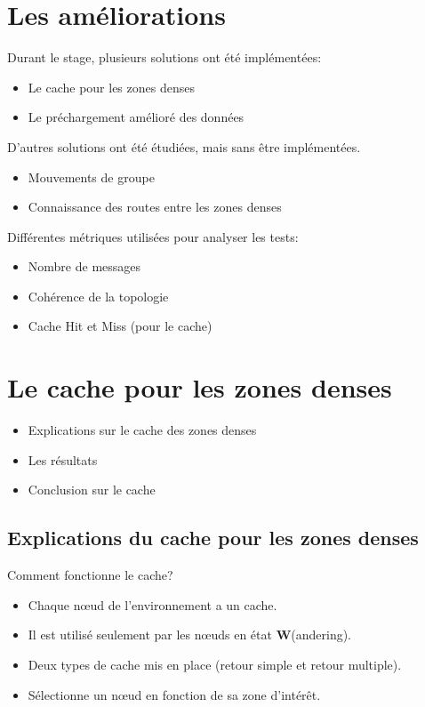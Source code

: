 \documentclass{beamer}
\begin{document}
  \section{Les améliorations}
  \begin{frame}
	Durant le stage, plusieurs solutions ont été implémentées:
	\begin{itemize}
		\pause\item Le cache pour les zones denses
		\pause\item Le préchargement amélioré des données
	\end{itemize}
	\pause D'autres solutions ont été étudiées, mais sans être implémentées.
	\begin{itemize}
		\item Mouvements de groupe
		\item Connaissance des routes entre les zones denses
	\end{itemize}
  \end{frame}

  \begin{frame}
	Différentes métriques utilisées pour analyser les tests:
	\begin{itemize}
		\item Nombre de messages
		\item Cohérence de la topologie
		\item Cache Hit et Miss (pour le cache)
	\end{itemize}
  \end{frame}

  \section{Le cache pour les zones denses}
  \begin{frame}
	\begin{itemize}
		\item Explications sur le cache des zones denses
		\item Les résultats 
		\item Conclusion sur le cache
	\end{itemize}
  \end{frame}
  
  \subsection{Explications du cache pour les zones denses}
  \begin{frame}
	Comment fonctionne le cache?
	\begin{itemize}
 		\item Chaque nœud de l'environnement a un cache.
		\item Il est utilisé seulement par les nœuds en état \textbf{W}(andering).
		\item Deux types de cache mis en place (retour simple et retour multiple).
		\item Sélectionne un nœud en fonction de sa zone d'intérêt.
	\end{itemize}
  \end{frame}
 
\end{document}
